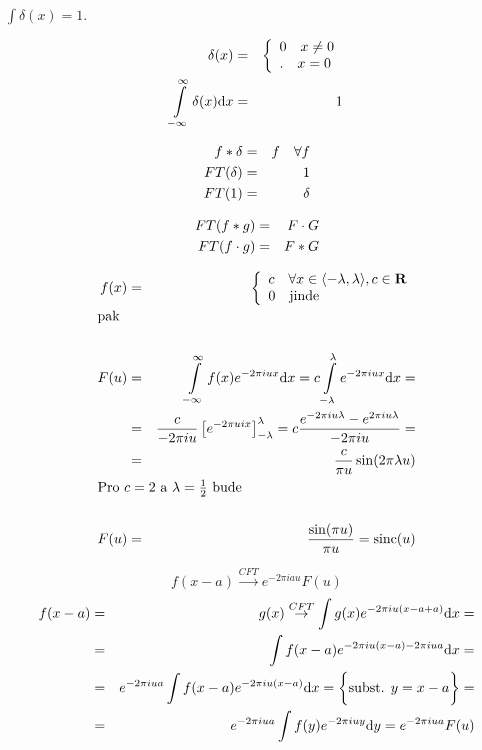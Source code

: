 $\int \delta(x)=1$.

\begin{eqnarray}
\delta(x)&=&\left\{\begin{array}{ll}0\quad x\neq0\\.\quad x=0\end{array}\right.\\
\int\limits_{-\infty}^\infty\delta(x){\rm d} x&=&1
\end{eqnarray}


\begin{eqnarray}
f\ast\delta&=&f\quad\forall f\\
FT(\delta)&=&1\\
FT(1)&=&\delta
\end{eqnarray}


\begin{eqnarray}
FT(f\ast g)&=&F\cdot G\\
FT(f\cdot g)&=&F\ast G
\end{eqnarray}




\begin{eqnarray}
f(x)&=&\left\{\begin{array}{ll}c\quad\forall x\in\langle-\lambda,\lambda\rangle,c\in \R\\
0\quad\hbox{jinde}\end{array}\right.\\
\noalign{\hbox{pak}\nonumber}\\
F(u)&=&\int\limits_{-\infty}^{\infty}f(x)e^{-2\pi iux}\d x=c\int\limits_{-\lambda}^\lambda e^{-2\pi i u x}\d x=\nonumber\\
&=&\frac{c}{-2\pi i u}\left[e^{-2\pi uix}\right]_{-\lambda}^\lambda=c\frac{e^{-2\pi iu\lambda}-e^{2\pi iu\lambda}}{-2\pi i u}=\nonumber\\
&=&\frac{c}{\pi u}\sin(2\pi\lambda u)\\
\noalign{\hbox{Pro $c=2$ a $\lambda=\frac{1}{2}$ bude\nonumber}}\\
F(u)&=&\frac{\sin(\pi u)}{\pi u}=\mathrm{sinc}(u)
\end{eqnarray}






\begin{equation}
f(x-a)\stackrel{CFT}{\rightarrow} e^{-2\pi i a u} F(u)
\end{equation}
\begin{eqnarray}
f(x-a)&=&g(x)\stackrel{CFT}{\rightarrow}\int g(x)e^{-2\pi i u (x-a+a)}{\rm d} x=\nonumber\\
&=&\int f(x-a)e^{-2\pi i u (x-a)-2\pi i u a}{\rm d} x=\nonumber\\
&=&e^{-2\pi i u a}\int f(x-a)e^{-2\pi i u (x-a)}{\rm d} x=\bigg\{\hbox{subst. $y=x-a$}\bigg\}=\nonumber\\
&=&e^{-2\pi i u a}\int f(y)e^{-2\pi i u y}{\rm d} y=e^{-2\pi i u a}F(u)
\end{eqnarray}



